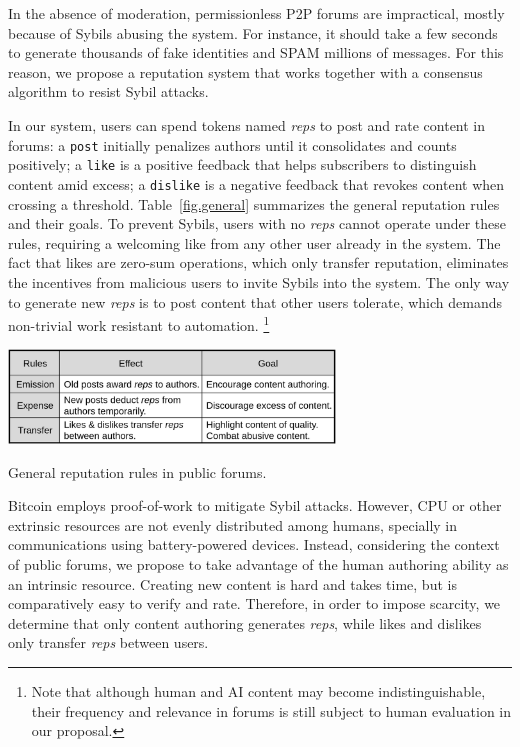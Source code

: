 \documentclass[12pt]{article}
\newcommand{\reps}     {\emph{reps}\xspace}
\newcommand{\code}[1]  {\texttt{\footnotesize{#1}}}
\begin{document}
In the absence of moderation, permissionless P2P forums are impractical, mostly
because of Sybils abusing the system.
For instance, it should take a few seconds to generate thousands of fake
identities and SPAM millions of messages.
For this reason, we propose a reputation system that works together with a
consensus algorithm to resist Sybil attacks.

In our system, users can spend tokens named \reps to post and rate content in
forums:
a \code{post} initially penalizes authors until it consolidates and counts
positively;
a \code{like} is a positive feedback that helps subscribers to distinguish
content amid excess;
a \code{dislike} is a negative feedback that revokes content when crossing a
threshold.
Table~\ref{fig.general} summarizes the general reputation rules and their
goals.
To prevent Sybils, users with no \reps cannot operate under these rules,
requiring a welcoming like from any other user already in the system.
The fact that likes are zero-sum operations, which only transfer reputation,
eliminates the incentives from malicious users to invite Sybils into the
system.
The only way to generate new \reps is to post content that other users
tolerate, which demands non-trivial work resistant to automation.%
\footnote{
    Note that although human and AI content may become indistinguishable, their
    frequency and relevance in forums is still subject to human evaluation in
    our proposal.
}

\begin{table}
\centering
\includegraphics[width=0.65\textwidth]{general.png}
\caption{General reputation rules in public forums.}
\label{fig.general}
\end{table}

Bitcoin employs proof-of-work to mitigate Sybil attacks.
However, CPU or other extrinsic resources are not evenly distributed among
humans, specially in communications using battery-powered devices.
%
Instead, considering the context of public forums, we propose to take advantage
of the human authoring ability as an intrinsic resource.
Creating new content is hard and takes time, but is comparatively easy to
verify and rate.
Therefore, in order to impose scarcity, we determine that only content
authoring generates \reps, while likes and dislikes only transfer \reps between
users.
\end{document}
